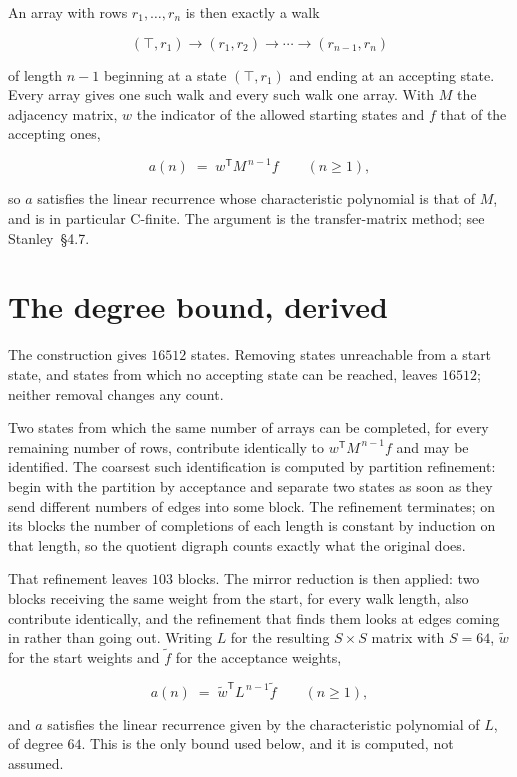 \documentclass[11pt]{article}
\theoremstyle{definition}
\begin{document}
An array with rows $r_1,\dots,r_n$ is then exactly a walk

\[(\top,r_1) \to (r_1,r_2) \to \cdots \to (r_{n-1},r_n)\]

of length $n-1$ beginning at a state $(\top,r_1)$ and ending at an accepting state. Every array gives one such walk and every such walk one array. With $M$ the adjacency matrix, $w$ the indicator of the allowed starting states and $f$ that of the accepting ones,

\[a(n) \;=\; w^{\mathsf T} M^{\,n-1} f \qquad (n \ge 1),\]

so $a$ satisfies the linear recurrence whose characteristic polynomial is that of $M$, and is in particular C-finite. The argument is the transfer-matrix method; see Stanley~\S4.7.

\section{The degree bound, derived}

The construction gives $16512$ states. Removing states unreachable from a start state, and states from which no accepting state can be reached, leaves $16512$; neither removal changes any count.

Two states from which the same number of arrays can be completed, for every remaining number of rows, contribute identically to $w^{\mathsf T}M^{\,n-1}f$ and may be identified. The coarsest such identification is computed by partition refinement: begin with the partition by acceptance and separate two states as soon as they send different numbers of edges into some block. The refinement terminates; on its blocks the number of completions of each length is constant by induction on that length, so the quotient digraph counts exactly what the original does.

That refinement leaves $103$ blocks. The mirror reduction is then applied: two blocks receiving the same weight from the start, for every walk length, also contribute identically, and the refinement that finds them looks at edges coming in rather than going out. Writing $L$ for the resulting $S \times S$ matrix with $S = 64$, $\tilde w$ for the start weights and $\tilde f$ for the acceptance weights,

\[a(n) \;=\; \tilde w^{\mathsf T} L^{\,n-1} \tilde f \qquad (n \ge 1),\]

and $a$ satisfies the linear recurrence given by the characteristic polynomial of $L$, of degree $64$. This is the only bound used below, and it is computed, not assumed.
\end{document}
